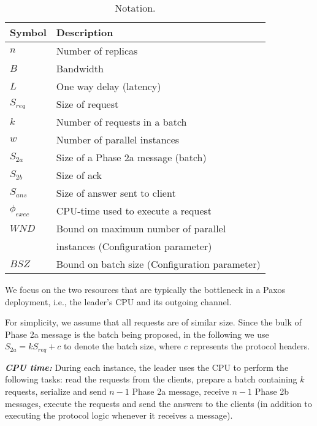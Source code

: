 \documentclass[10pt,preprint]{sigplanconf}
\begin{document}
\begin{table}[h]
\begin{center}
\begin{tabular}{l l} %
Symbol & Description\\
\hline
$n$ & Number of replicas\\
$B$ & Bandwidth\\
$L$ & One way delay (latency)\\
$S_{req}$ & Size of request\\
$k$ & Number of requests in a batch\\
$w$ & Number of parallel instances\\
$S_{2a}$ & Size of a Phase 2a message (batch)\\
$S_{2b}$ & Size of ack\\
$S_{ans}$ & Size of answer sent to client\\
$\phi_{exec}$ & CPU-time used to execute a request\\
$WND$ & Bound on maximum number of parallel\\
      & instances (Configuration parameter)\\
$BSZ$ & Bound on batch size (Configuration parameter)
\end{tabular}
\vspace{-.1in} %
\end{center}
\caption{Notation.}
\label{tab:notation}
\end{table}

We focus on the two resources that are typically the bottleneck in a Paxos deployment, i.e., the leader's CPU and its outgoing channel.

For simplicity, we assume that all requests are of similar size. Since the bulk of Phase 2a message is the batch being proposed, in the following we use $S_{2a} = kS_{req} + c$ to denote the batch size, where $c$ represents the protocol headers.

\textbf{\emph{CPU time:}} During each instance, the leader uses the CPU to perform the following tasks: read the requests from the clients, prepare a batch containing $k$ requests, serialize and send $n - 1$ Phase 2a message, receive $n - 1$ Phase 2b messages, execute the requests and send the answers to the clients (in addition to executing the protocol logic whenever it receives a message).
\end{document}
